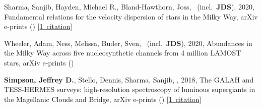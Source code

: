\item[{\color{numcolor}\scriptsize3}] Sharma, Sanjib, Hayden, Michael R., Bland-Hawthorn, Joss, \etal\ (incl.\ \textbf{JDS}), 2020, Fundamental relations for the velocity dispersion of stars in the Milky Way, arXiv e-prints () [\href{https://ui.adsabs.harvard.edu/#abs/2020arXiv200406556S}{1~citation}]

\item[{\color{numcolor}\scriptsize2}] Wheeler, Adam, Ness, Melissa, Buder, Sven, \etal\ (incl.\ \textbf{JDS}), 2020, Abundances in the Milky Way across five nucleosynthetic channels from 4 million LAMOST stars, arXiv e-prints ()

\item[{\color{numcolor}\scriptsize1}] \textbf{Simpson, Jeffrey D.}, Stello, Dennis, Sharma, Sanjib, \etal, 2018, The GALAH and TESS-HERMES surveys: high-resolution spectroscopy of luminous supergiants in the Magellanic Clouds and Bridge, arXiv e-prints () [\href{https://ui.adsabs.harvard.edu/#abs/2018arXiv180405900S}{1~citation}]